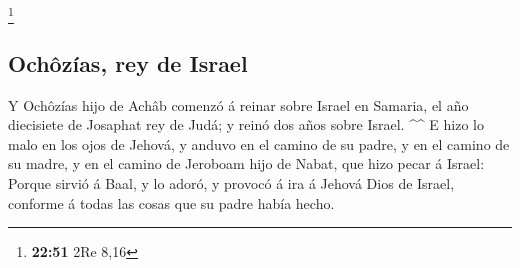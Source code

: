 \footnote{\textbf{22:51} 2Re 8,16}

\hypertarget{ochuxf4zuxedas-rey-de-israel}{%
\subsection{Ochôzías, rey de
Israel}\label{ochuxf4zuxedas-rey-de-israel}}

 Y Ochôzías hijo de Achâb comenzó á reinar sobre Israel en
Samaria, el año diecisiete de Josaphat rey de Judá; y reinó dos años
sobre Israel. \^{}\^{}  E hizo lo malo en los ojos de
Jehová, y anduvo en el camino de su padre, y en el camino de su madre, y
en el camino de Jeroboam hijo de Nabat, que hizo pecar á Israel: Porque
sirvió á Baal, y lo adoró, y provocó á ira á Jehová Dios de Israel,
conforme á todas las cosas que su padre había hecho.
